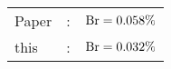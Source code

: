       \begin{tabular}{lcr}
          Paper &:& $\mathrm{Br}  = 0.058\%$ \\
          this      &:& $\mathrm{Br}  = 0.032\%$ \\        
      \end{tabular}
